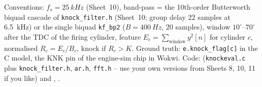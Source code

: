 Conventions: $f_s=\SI{25}{kHz}$ (Sheet~10), band-pass = the 10th-order Butterworth
biquad cascade of \texttt{knock\_filter.h} (Sheet~10; group delay 22 samples at
\SI{6.5}{kHz}) or the single biquad \texttt{kf\_bp2} ($B=\SI{400}{Hz}$, 20 samples),
window $10^\circ$--$70^\circ$ after the TDC of the firing cylinder, feature
$E_c=\sum_{\text{window}}y^2[n]$ for cylinder $c$, normalised
$R_c=E_c/B_c$, knock if $R_c>K$. Ground truth: \texttt{e.knock\_flag[c]} in the
C model, the KNK pin of the engine-sim chip in Wokwi. Code:
 (\texttt{knockeval.c} plus \texttt{knock\_filter.h},
\texttt{ar.h}, \texttt{fft.h} -- use your own versions from Sheets 8, 10, 11 if you
like) and , .

